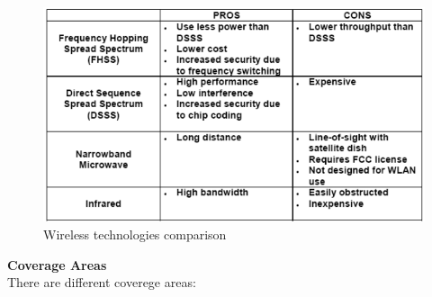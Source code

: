 \begin{figure}[!h] 
    \centering 
    \includegraphics[scale = 0.4]{images/tech-wireless-comparison-physical.png} 
    \caption{Wireless technologies comparison}
    \label{tech-wireless-comparison-physical}
\end{figure}
\textbf{Coverage Areas}\\[0.2cm]
There are different coverege areas:
